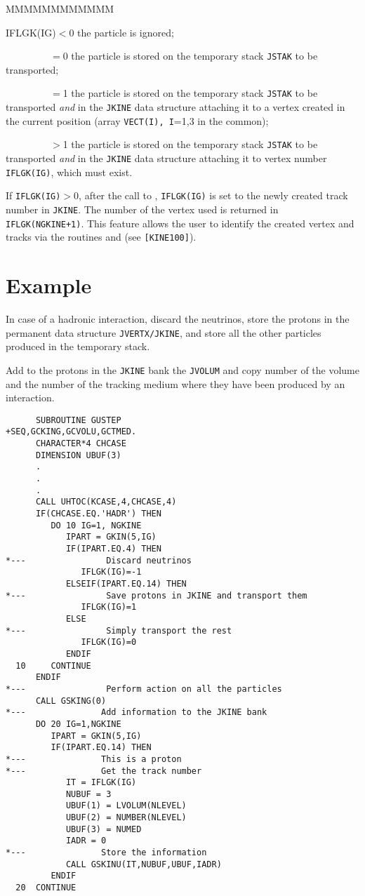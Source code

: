 \begin{DLtt}{MMMMMMMMMMMM}
\item[IFLGK(IG)$<$0] the particle is ignored;
\item[~~~~~~~~~$=$0] the particle is stored on the temporary stack {\tt JSTAK}
to be transported;
\item[~~~~~~~~~$=$1] the particle is stored on the temporary stack {\tt JSTAK}
to be transported {\it and} in the {\tt JKINE} data structure attaching it to
a vertex created in the current position (array {\tt VECT(I), I}=1,3 in the
 common);
\item[~~~~~~~~~$>$1] the particle is stored on the temporary stack {\tt JSTAK}
to be transported {\it and} in the {\tt JKINE} data structure attaching it to
vertex number {\tt IFLGK(IG)}, which must exist.
\end{DLtt}

If {\tt IFLGK(IG)}$>$0, after the call to , {\tt IFLGK(IG)} is
set to the newly created track number in {\tt JKINE}. The number of the
vertex used is returned in {\tt IFLGK(NGKINE+1)}. This feature allows the
user to identify the created vertex and tracks via the routines 
 and  (see {\tt [KINE100]}).

\section*{Example}

In case of a hadronic interaction, discard the neutrinos, store the protons
in the permanent data structure {\tt JVERTX/JKINE}, and store all the
other particles produced in the temporary stack.

Add to the protons in the {\tt JKINE} bank the {\tt JVOLUM}
and copy number of the 
volume and the number of the tracking medium where they have been produced
by an interaction.

\begin{verbatim}
      SUBROUTINE GUSTEP
+SEQ,GCKING,GCVOLU,GCTMED.
      CHARACTER*4 CHCASE
      DIMENSION UBUF(3)
      .
      .
      .
      CALL UHTOC(KCASE,4,CHCASE,4)
      IF(CHCASE.EQ.'HADR') THEN
         DO 10 IG=1, NGKINE
            IPART = GKIN(5,IG)
            IF(IPART.EQ.4) THEN
*---                Discard neutrinos
               IFLGK(IG)=-1
            ELSEIF(IPART.EQ.14) THEN
*---                Save protons in JKINE and transport them
               IFLGK(IG)=1
            ELSE
*---                Simply transport the rest
               IFLGK(IG)=0
            ENDIF
  10     CONTINUE
      ENDIF
*---                Perform action on all the particles
      CALL GSKING(0)
*---               Add information to the JKINE bank
      DO 20 IG=1,NGKINE
         IPART = GKIN(5,IG)
         IF(IPART.EQ.14) THEN
*---               This is a proton
*---               Get the track number
            IT = IFLGK(IG)
            NUBUF = 3
            UBUF(1) = LVOLUM(NLEVEL)
            UBUF(2) = NUMBER(NLEVEL)
            UBUF(3) = NUMED
            IADR = 0
*---               Store the information
            CALL GSKINU(IT,NUBUF,UBUF,IADR)
         ENDIF
  20  CONTINUE
\end{verbatim}
